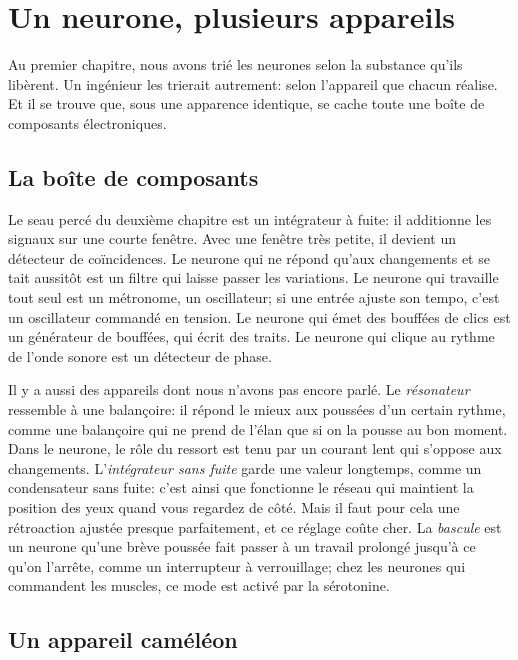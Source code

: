 \chapter{Un neurone, plusieurs appareils}

Au premier chapitre, nous avons trié les neurones selon la substance qu'ils libèrent. Un ingénieur les trierait autrement: selon l'appareil que chacun réalise. Et il se trouve que, sous une apparence identique, se cache toute une boîte de composants électroniques.

\section*{La boîte de composants}

Le seau percé du deuxième chapitre est un intégrateur à fuite: il additionne les signaux sur une courte fenêtre. Avec une fenêtre très petite, il devient un détecteur de coïncidences. Le neurone qui ne répond qu'aux changements et se tait aussitôt est un filtre qui laisse passer les variations. Le neurone qui travaille tout seul est un métronome, un oscillateur; si une entrée ajuste son tempo, c'est un oscillateur commandé en tension. Le neurone qui émet des bouffées de clics est un générateur de bouffées, qui écrit des \og traits\fg{}. Le neurone qui clique au rythme de l'onde sonore est un détecteur de phase.


Il y a aussi des appareils dont nous n'avons pas encore parlé. Le \emph{résonateur} ressemble à une balançoire: il répond le mieux aux poussées d'un certain rythme, comme une balançoire qui ne prend de l'élan que si on la pousse au bon moment. Dans le neurone, le rôle du ressort est tenu par un courant lent qui s'oppose aux changements. L'\emph{intégrateur sans fuite} garde une valeur longtemps, comme un condensateur sans fuite: c'est ainsi que fonctionne le réseau qui maintient la position des yeux quand vous regardez de côté. Mais il faut pour cela une rétroaction ajustée presque parfaitement, et ce réglage coûte cher. La \emph{bascule} est un neurone qu'une brève poussée fait passer à un travail prolongé jusqu'à ce qu'on l'arrête, comme un interrupteur à verrouillage; chez les neurones qui commandent les muscles, ce mode est activé par la sérotonine.

\section*{Un appareil caméléon}

